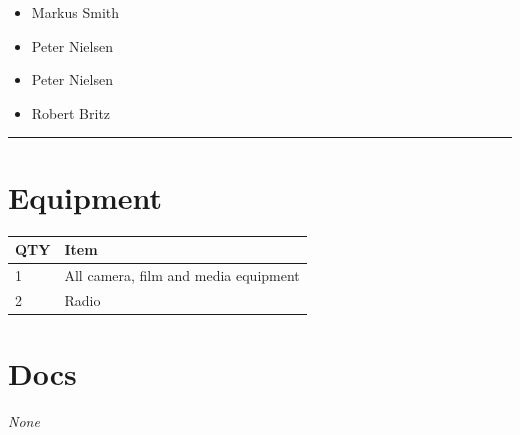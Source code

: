 \documentclass[10pt]{article}
\begin{document}
		

	\begin{multicols}{2}

		\begin{itemize}
									\item Markus Smith
									\item Peter Nielsen
						\end{itemize}

		\vfill\null
		\columnbreak

		\begin{itemize}
									\item Peter Nielsen
									\item Robert Britz
						\end{itemize}

		\vfill\null

		\end{multicols}



			\vspace{0.5cm}
	\hrule
	\vspace{0.5cm}

	\begin{multicols}{2}

		\section*{\faWrench \: Equipment}

		
	\begin{center}
			\begin{tabular}{p{2cm}p{4cm}}


				\textbf{QTY} & \textbf{Item} \\\toprule
												1&All camera, film and media equipment\\\midrule
												2&Radio\\\midrule
								\end{tabular}

			\end{center}

		
		\vfill\null
		\columnbreak

			\section*{\faFile \: Docs}
		 	\textit{None}
	

		\vfill\null

		\end{multicols}
\end{document}

